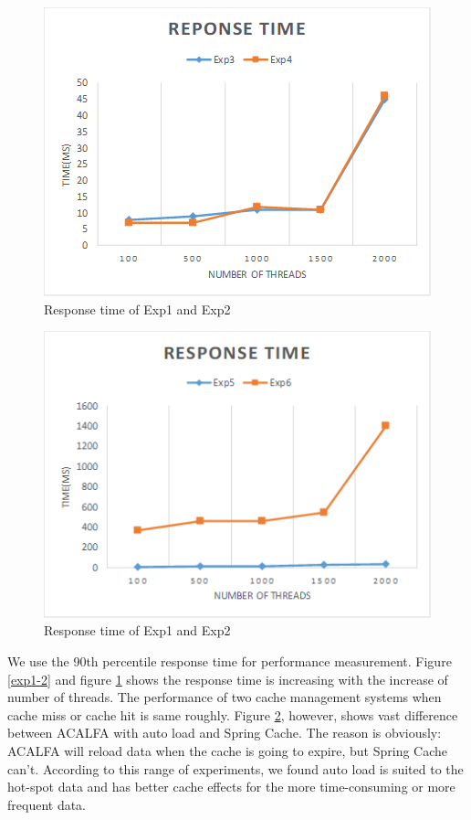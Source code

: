 \documentclass[conference]{IEEEtran}
\begin{document}
\begin{figure} [htb]
    \centering
    \includegraphics[width=1\linewidth]{img/exp3-4.png}
    \caption{Response time of Exp1 and Exp2}
    \label{exp3-4}
\end{figure}

\begin{figure} [htb]
    \centering
    \includegraphics[width=1\linewidth]{img/exp5-6.png}
    \caption{Response time of Exp1 and Exp2}
    \label{exp5-6}
\end{figure}

We use the 90th percentile response time for performance measurement. Figure \ref{exp1-2} and figure \ref{exp3-4} shows the response time is increasing with the increase of number of threads. The performance of two cache management systems when cache miss or cache hit is same roughly. Figure \ref{exp5-6}, however, shows vast difference between ACALFA with auto load and Spring Cache. The reason is obviously: ACALFA will reload data when the cache is going to expire, but Spring Cache can't. According to this range of experiments, we found auto load is suited to the hot-spot data and has better cache effects for the more time-consuming or more frequent data.
\end{document}
